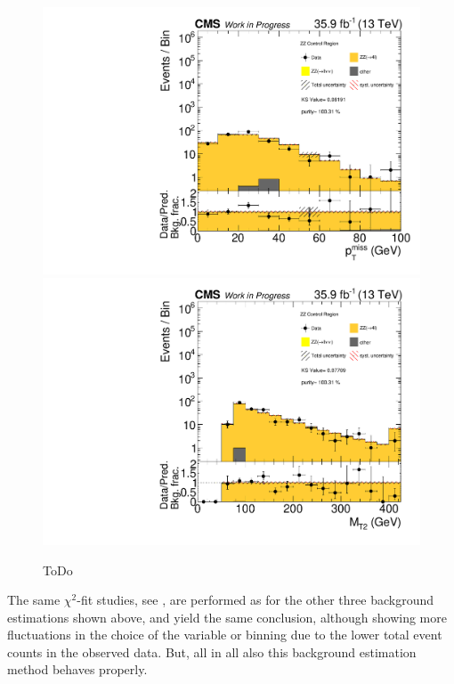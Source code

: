 \begin{figure}[htb]
 \centering
 \includegraphics[width=\pairwidth]{figures/plots_CR_zz/CRZZ_LL_nom_met_log}
 \includegraphics[width=\pairwidth]{figures/plots_CR_zz/CRZZ_LL_nom_mt2_log}
 \caption{ToDo}
 \label{fig:CRZZ}
\end{figure}
The same $\chi^2$-fit studies, see , are performed as for the other three background estimations shown above, and yield the same conclusion, although showing more fluctuations in the choice of the variable or binning due to the lower total event counts in the observed data. But, all in all also this background estimation method behaves properly.
